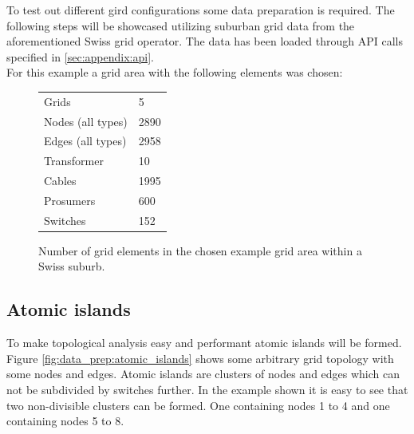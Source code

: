 
To test out different gird configurations some data preparation is required. The following
steps will be showcased utilizing suburban grid data from the aforementioned
Swiss grid operator. The data has been loaded through API calls specified in
\autoref{sec:appendix:api}.\\ For this example
a grid area with the following elements was chosen:

\begin{figure}[H]
    \begin{center}
        \begin{tabular}{ll}
            Grids & 5\\
            Nodes (all types) & 2890\\
            Edges (all types) & 2958\\
            Transformer & 10\\
            Cables & 1995\\
            Prosumers & 600\\
            Switches & 152\\
        \end{tabular}
    \end{center}
    \caption{
        Number of grid elements in the chosen example grid area within a Swiss suburb.
    }
    \label{table:data_prep:swiss_suburban_numbers}
\end{figure}

\subsection{Atomic islands}

To make topological analysis easy and performant atomic islands will be formed.
Figure \ref{fig:data_prep:atomic_islands}
shows some arbitrary grid topology with some nodes and edges. Atomic islands are clusters
of nodes and edges which can not be subdivided by switches further. In the example shown
it is easy to see that two non-divisible clusters can be formed. One containing nodes
1 to 4 and one containing nodes 5 to 8.

